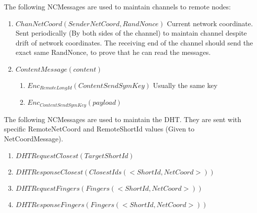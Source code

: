 \documentclass{amsart}
\theoremstyle{definition}
\theoremstyle{remark}
\numberwithin{equation}{section}
\begin{document}
The following NCMessages are used to maintain channels to remote nodes:

\begin{enumerate}
  \item $ChanNetCoord(SenderNetCoord, RandNonce)$ Current network coordinate. Sent
    periodically (By both sides of the channel) to maintain channel despite
    drift of network coordinates. The receiving end of the channel should send
    the exact same RandNonce, to prove that he can read the messages.
  \item $ContentMessage(content)$
    \begin{enumerate}
      \item $Enc_{RemoteLongId}(ContentSendSymKey)$ Usually the same key
      \item $Enc_{ContentSendSymKey}(payload)$
    \end{enumerate}
\end{enumerate}

The following NCMessages are used to maintain the DHT. They are sent with specific
RemoteNetCoord and RemoteShortId values (Given to NetCoordMessage).

\begin{enumerate}
  \item $DHTRequestClosest(TargetShortId)$
  \item $DHTResponseClosest(ClosestIds(<ShortId, NetCoord>))$
  \item $DHTRequestFingers(Fingers(<ShortId, NetCoord>))$
  \item $DHTResponseFingers(Fingers(<ShortId, NetCoord>))$
\end{enumerate}



\end{document}

